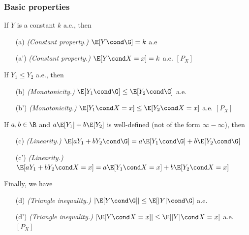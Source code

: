 \documentclass{article} %
\begin{document}
\subsubsection{Basic properties}

\begin{theorem}
If $Y$ is a constant $k$ a.e., then
\begin{itemize}
	\item[(a)] \textit{(Constant property.)} $\E[Y \cond \G]=k$ a.e
	\item[(a')] \textit{(Constant property.)} $\E[Y \cond X=x]=k$ a.e. $[P_X]$
\end{itemize}
If $Y_1 \leq Y_2$ a.e., then
\begin{itemize}
	\item[(b)] \textit{(Monotonicity.)} $\E[Y_1 \cond \G] \leq \E[Y_2 \cond \G]$ a.e.
	\item[(b')] \textit{(Monotonicity.)} $\E[Y_1 \cond X=x] \leq \E[Y_2 \cond X=x]$ a.e. $[P_X]$
\end{itemize}
If $a,b \in \R$ and $a \E[Y_1] + b \E[Y_2]$ is well-defined (not of the form $\infty-\infty$), then 
\begin{itemize}
	\item[(c)] \textit{(Linearity.)} $\E[aY_1 + bY_2 \cond \G] = a \E[Y_1 \cond \G] + b\E[Y_2 \cond \G] $
	\item[(c')] \textit{(Linearity.)}  $\E[aY_1 + bY_2 \cond X=x] = a \E[Y_1 \cond X=x] + b\E[Y_2 \cond X=x] $ 
\end{itemize}
Finally, we have
\begin{itemize}
	\item[(d)] \textit{(Triangle inequality.)} $| \E[Y \cond \G]| \leq \E[|Y| \cond \G]$ a.e.
	\item[(d')] \textit{(Triangle inequality.)}  $| \E[Y \cond X=x]| \leq \E[|Y| \cond X=x]$ a.e. $[P_X]$
\end{itemize}
\end{theorem}
\end{document}

